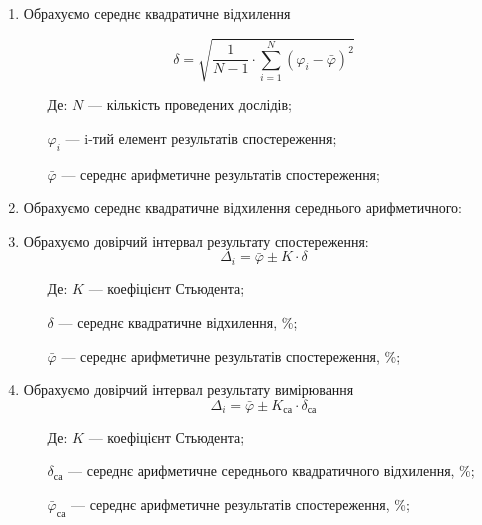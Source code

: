 \begin{enumerate}[leftmargin=*]
\item Обрахуємо середнє квадратичне відхилення

  \begin{equation}
    \delta = \sqrt{\frac{1}{N-1} \cdot \displaystyle\sum_{i=1}^{N} ({\varphi_i} -\bar{\varphi})^2}
  \end{equation}
  
  \begin{itemize}
  \item [Де:] $N$ --- кількість проведених дослідів;
  \item []$\varphi_i$ ---  i-тий елемент результатів спостереження;
  \item []$\bar{\varphi}$ ---  середнє арифметичне результатів спостереження;
  \end{itemize}

  
  
\item Обрахуємо середнє квадратичне відхилення середнього арифметичного:
  

\item Обрахуємо довірчий інтервал результату спостереження:
  \begin{equation}
    \Delta_i = \bar{\varphi} \pm K \cdot \delta
  \end{equation}

  \begin{itemize}
  \item [Де:] $K$ --- коефіцієнт Стьюдента;
  \item []$\delta$ ---  середнє квадратичне відхилення, \%;
  \item []$\bar{\varphi}$ ---  середнє арифметичне результатів спостереження, \%;
  \end{itemize}
  

\item Обрахуємо довірчий інтервал результату вимірювання
  \begin{equation}
    \Delta_i = \bar{\varphi} \pm K_{\text{са}} \cdot \delta_{\text{са}}
  \end{equation}

  \begin{itemize}
  \item [Де:] $K$ --- коефіцієнт Стьюдента;
  \item []$\delta_{\text{са}}$ ---  середнє арифметичне середнього квадратичного відхилення, \%;
  \item []$\bar{\varphi}_{\text{са}}$ ---  середнє арифметичне результатів спостереження, \%;
  \end{itemize}
\end{enumerate}
  
